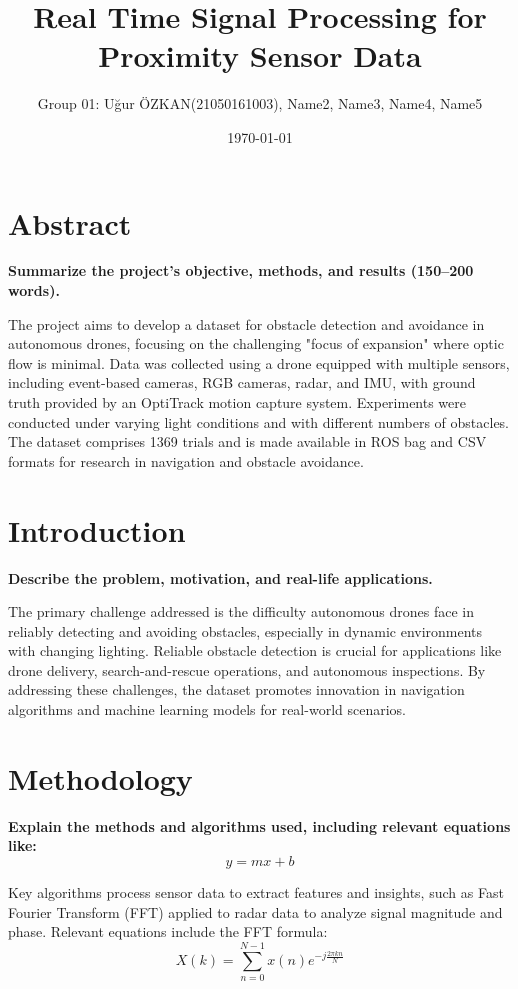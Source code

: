 \documentclass[12pt,a4paper]{article}
\title{Real Time Signal Processing for Proximity Sensor Data}
\author{Group 01: Uğur ÖZKAN(21050161003), Name2, Name3, Name4, Name5}
\date{\today}
\begin{document}
\maketitle
\section{Abstract}
\textbf{Summarize the project's objective, methods, and results (150--200 words).}

The project aims to develop a dataset for obstacle detection and avoidance in autonomous drones, focusing on the challenging "focus of expansion" where optic flow is minimal. Data was collected using a drone equipped with multiple sensors, including event-based cameras, RGB cameras, radar, and IMU, with ground truth provided by an OptiTrack motion capture system. Experiments were conducted under varying light conditions and with different numbers of obstacles. The dataset comprises 1369 trials and is made available in ROS bag and CSV formats for research in navigation and obstacle avoidance.

\section{Introduction}
\textbf{Describe the problem, motivation, and real-life applications.}

The primary challenge addressed is the difficulty autonomous drones face in reliably detecting and avoiding obstacles, especially in dynamic environments with changing lighting. Reliable obstacle detection is crucial for applications like drone delivery, search-and-rescue operations, and autonomous inspections. By addressing these challenges, the dataset promotes innovation in navigation algorithms and machine learning models for real-world scenarios.

\section{Methodology}
\textbf{Explain the methods and algorithms used, including relevant equations like:}
\begin{equation}
    y = mx + b
\end{equation}

Key algorithms process sensor data to extract features and insights, such as Fast Fourier Transform (FFT) applied to radar data to analyze signal magnitude and phase. Relevant equations include the FFT formula:
\begin{equation}
X(k) = \sum_{n=0}^{N-1} x(n) e^{-j\frac{2\pi k n}{N}}
\end{equation} 
\end{document}
